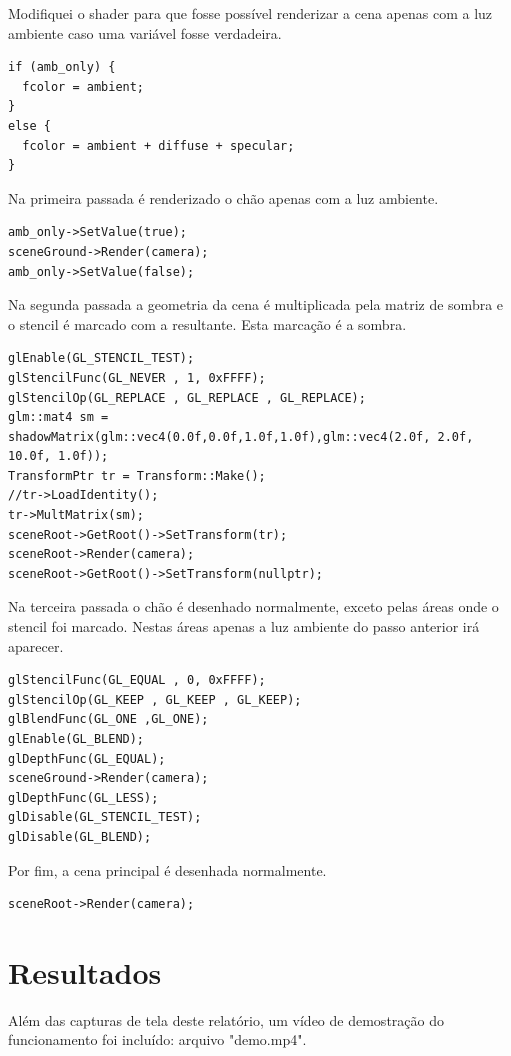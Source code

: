 \documentclass[11pt, a4paper]{article}
\begin{document}
Modifiquei o shader para que fosse possível renderizar a cena apenas com a luz 
ambiente caso uma variável fosse verdadeira.

\begin{verbatim}
if (amb_only) {
  fcolor = ambient;
}
else {
  fcolor = ambient + diffuse + specular;
}
\end{verbatim}

Na primeira passada é renderizado o chão apenas com a luz ambiente.

\begin{verbatim}
amb_only->SetValue(true);
sceneGround->Render(camera);
amb_only->SetValue(false);
\end{verbatim}


Na segunda passada a geometria da cena é multiplicada pela matriz de sombra e o 
stencil é marcado com a resultante. Esta marcação é a sombra.

\begin{verbatim}
glEnable(GL_STENCIL_TEST);
glStencilFunc(GL_NEVER , 1, 0xFFFF);
glStencilOp(GL_REPLACE , GL_REPLACE , GL_REPLACE);
glm::mat4 sm = shadowMatrix(glm::vec4(0.0f,0.0f,1.0f,1.0f),glm::vec4(2.0f, 2.0f, 
10.0f, 1.0f));
TransformPtr tr = Transform::Make();
//tr->LoadIdentity();
tr->MultMatrix(sm);
sceneRoot->GetRoot()->SetTransform(tr);
sceneRoot->Render(camera);
sceneRoot->GetRoot()->SetTransform(nullptr);
\end{verbatim}

Na terceira passada o chão é desenhado normalmente, exceto pelas áreas onde o 
stencil foi marcado. Nestas áreas apenas a luz ambiente do passo anterior irá 
aparecer.

\begin{verbatim}
glStencilFunc(GL_EQUAL , 0, 0xFFFF);
glStencilOp(GL_KEEP , GL_KEEP , GL_KEEP);
glBlendFunc(GL_ONE ,GL_ONE);
glEnable(GL_BLEND);
glDepthFunc(GL_EQUAL);
sceneGround->Render(camera);
glDepthFunc(GL_LESS);
glDisable(GL_STENCIL_TEST);
glDisable(GL_BLEND);
\end{verbatim}

Por fim, a cena principal é desenhada normalmente.

\begin{verbatim}
sceneRoot->Render(camera);
\end{verbatim}

\section {Resultados}

Além das capturas de tela deste relatório, um vídeo de demostração do funcionamento 
foi incluído: arquivo "demo.mp4".
\end{document}
